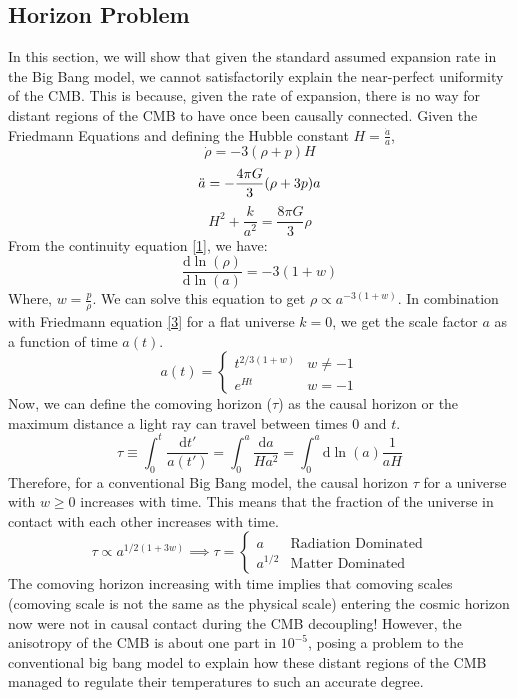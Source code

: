 \documentclass[aps,prd,reprint,preprintnumbers,showpacs,floatfix,nofootinbib,superscript address]{revtex4-2}
\begin{document}
\subsection{Horizon Problem}
In this section, we will show that given the standard assumed expansion rate in the Big Bang model, we cannot satisfactorily explain the near-perfect uniformity of the CMB. This is because, given the rate of expansion, there is no way for distant regions of the CMB to have once been causally connected.
Given the Friedmann Equations and defining the Hubble constant $H = \frac{\dot{a}}{a}$,
\begin{equation} \label{1}
    \dot{\rho} = -3(\rho + p)H
\end{equation}
\begin{equation} \label{2}
    \Ddot{a} = -\frac{4\pi G}{3} (\rho + 3p)a
\end{equation}
\begin{equation}    \label{3}
    H^2 + \frac{k}{a^2} = \frac{8 \pi G}{3} \rho
\end{equation}
From the continuity equation \ref{1}, we have:
\begin{equation} \label{4}
    \frac{\mathrm{d}  \ln(\rho)}{\mathrm{d} \ln(a)} = -3(1+w)
\end{equation}
Where, $w = \frac{p}{\rho}$. We can solve this equation to get $\rho \propto a^{-3(1+w)}$. In combination with Friedmann equation \ref{3} for a flat universe $k = 0$, we get the scale factor $a$ as a function of time $a(t)$.
\begin{equation}    \label{5}
    a(t) = \begin{cases}
        t^{2/3(1+w)} & w \neq -1 \\
        e^{Ht} & w = -1
    \end{cases}
\end{equation}
Now, we can define the comoving horizon ($\tau$) as the causal horizon or the maximum distance a light ray can travel between times 0 and $t$.
\begin{equation}    \label{6}
    \tau \equiv \int_{0}^{t} \frac{\mathrm{d} t'}{a(t')} = \int_{0}^{a} \frac{\mathrm{d}a}{H a^2} = \int_{0}^{a} \mathrm{d} \ln(a) \frac{1}{aH}
\end{equation}
Therefore, for a conventional Big Bang model, the causal horizon $\tau$ for a universe with $w \geq 0$ increases with time. This means that the fraction of the universe in contact with each other increases with time.
\begin{equation}
    \tau \propto a^{1/2(1+3w)} \implies \tau = \begin{cases}
        a & \text{Radiation Dominated} \\
        a^{1/2} & \text{Matter Dominated}
    \end{cases}
\end{equation}
The comoving horizon increasing with time implies that comoving scales (comoving scale is not the same as the physical scale) entering the cosmic horizon now were not in causal contact during the CMB decoupling! However, the anisotropy of the CMB is about one part in $10^{-5}$, posing a problem to the conventional big bang model to explain how these distant regions of the CMB managed to regulate their temperatures to such an accurate degree.
\end{document}
